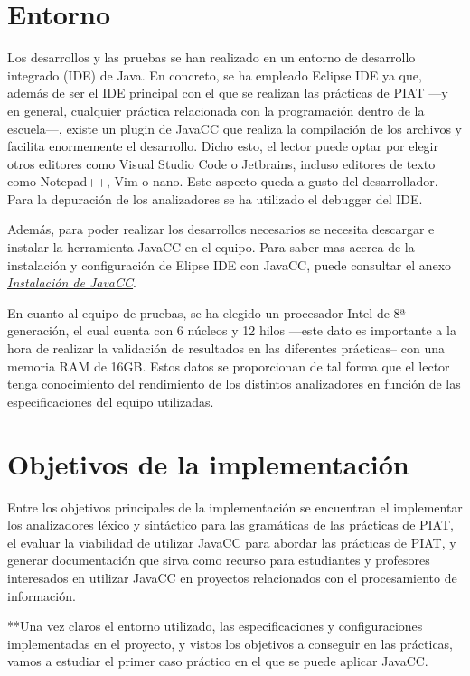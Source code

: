 \section{Entorno}
\noindent Los desarrollos y las pruebas se han realizado en un entorno de desarrollo integrado (IDE) de Java. En concreto, se ha empleado Eclipse IDE ya que, además de ser el IDE principal con el que se realizan las prácticas de PIAT ---y en general, cualquier práctica relacionada con la programación dentro de la escuela---, existe un plugin de JavaCC que realiza la compilación de los archivos y facilita enormemente el desarrollo. Dicho esto, el lector puede optar por elegir otros editores como Visual Studio Code o Jetbrains, incluso editores de texto como Notepad++, Vim o  nano. Este aspecto queda a gusto del desarrollador. Para la depuración de los analizadores se ha utilizado el debugger del IDE.

Además, para poder realizar los desarrollos necesarios se necesita descargar e instalar la herramienta JavaCC en el equipo. Para saber mas acerca de la instalación y configuración de Elipse IDE con JavaCC, puede consultar el anexo \hyperref[sec:instalaciondejavacc]{\textit{Instalación de JavaCC}}.

En cuanto al equipo de pruebas, se ha elegido un procesador Intel de 8ª generación, el cual cuenta con 6 núcleos y 12 hilos ---este dato es importante a la hora de realizar la validación de resultados en las diferentes prácticas-- con una memoria RAM de 16GB. Estos datos se proporcionan de tal forma que el lector tenga conocimiento del rendimiento de los distintos analizadores en función de  las especificaciones del equipo utilizadas.

\section{Objetivos de la implementación}
\noindent Entre los objetivos principales de la implementación se encuentran el implementar los analizadores léxico y sintáctico para las gramáticas de las prácticas de PIAT, el evaluar la viabilidad de utilizar JavaCC para abordar las prácticas de PIAT, y generar documentación que sirva como recurso para estudiantes y profesores interesados en utilizar JavaCC en proyectos relacionados con el procesamiento de información.

**Una vez claros el entorno utilizado, las especificaciones y configuraciones implementadas en el proyecto, y vistos los objetivos a conseguir en las prácticas, vamos a estudiar el primer caso práctico en el que se puede aplicar JavaCC.

